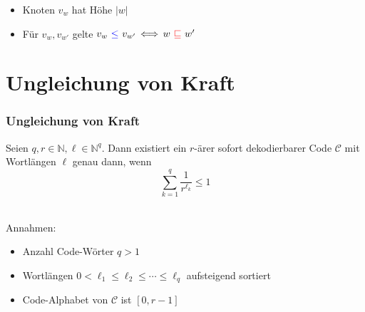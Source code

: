 \documentclass{beamer}
\begin{document}
\begin{frame}[t]
\begin{center}
    \end{center}
    \pause
    \begin{itemize}
        \setlength\itemsep{2em}
        \item Knoten $v_w$ hat Höhe $|w|$
        \pause
        \item Für $v_w, v_{w'}$ gelte
            $v_w\ {\color{blue}\leq}\ v_{w'} \,\Longleftrightarrow\, w\ {\color{red}\sqsubseteq}\ w'$
    \end{itemize}
\end{frame}

\section{Ungleichung von Kraft}
\begin{frame}
    \frametitle{Ungleichung von Kraft}
    Seien $q,r \in \mathbb{N}, \ell \in \mathbb{N}^q$. Dann existiert ein $r$-ärer sofort dekodierbarer Code $\mathcal{C}$
    mit Wortlängen $\ell$ genau dann, wenn
    $$
        \sum_{k=1}^{q} \frac{1}{r^{\ell_k}} \leq 1
    $$\\[20pt]
    \pause

    Annahmen:

    \begin{itemize}
        \setlength\itemsep{1em}
        \item Anzahl Code-Wörter $q > 1$
        \item Wortlängen $0 < \ell_1 \leq \ell_2 \leq \cdots \leq \ell_q$
            aufsteigend sortiert
        \item Code-Alphabet von $\mathcal{C}$ ist $[0,r-1]$
    \end{itemize}
\end{frame}
\end{document}
